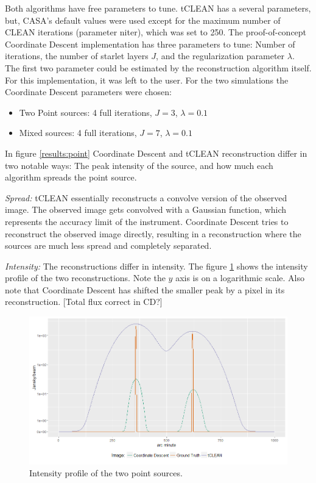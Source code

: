 Both algorithms have free parameters to tune. tCLEAN has a several parameters, but, CASA's default values were used except for the maximum number of CLEAN iterations (parameter niter), which was set to 250. The proof-of-concept Coordinate Descent implementation has three parameters to tune: Number of iterations, the number of starlet layers $J$, and the regularization parameter $\lambda$. The first two parameter could be estimated by the reconstruction algorithm itself. For this implementation, it was left to the user. For the two simulations the Coordinate Descent parameters were chosen:
\begin{itemize}
	\item Two Point sources: 4 full iterations, $J=3$, $\lambda=0.1$
	\item Mixed sources: 4 full iterations, $J=7$, $\lambda=0.1$
\end{itemize}

In figure \ref{results:point} Coordinate Descent and tCLEAN reconstruction differ in two notable ways: The peak intensity of the source, and how much each algorithm spreads the point source. 

\textit{Spread:} tCLEAN essentially reconstructs a convolve version of the observed image. The observed image gets convolved with a Gaussian function, which represents the accuracy limit of the instrument. Coordinate Descent tries to reconstruct the observed image directly, resulting in a reconstruction where the sources are much less spread and completely separated. 

\textit{Intensity:} The reconstructions differ in intensity. The figure \ref{results:points:contour} shows the intensity profile of the two reconstructions. Note the $y$ axis is on a logarithmic scale. Also note that Coordinate Descent has shifted the smaller peak by a pixel in its reconstruction. [Total flux correct in CD?]

\begin{figure}[h]
	\centering
	\includegraphics[width=0.8\linewidth]{./chapters/20.results/points/line.png}
	\caption{Intensity profile of the two point sources.}
	\label{results:points:contour}
\end{figure}

